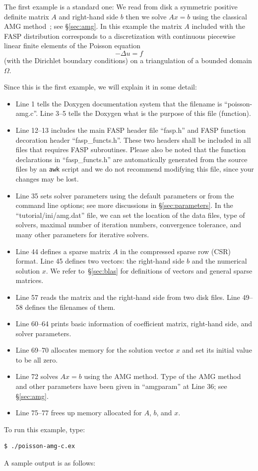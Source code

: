\documentclass[11pt]{memoir}
\begin{document}
The first example is a standard one: We read from disk a symmetric
positive definite matrix $A$ and right-hand side $b$ then we solve
$Ax=b$ using the classical AMG
method~\cite{Brandt.BrandtMcCormick.1982uq,Ruge.RugeStuben.1985ij,Ruge.RugeStuben.1987bs};
see \S\ref{sec:amg}. In this example the matrix $A$ included with the
FASP distribution corresponds to a discretization with continuous
piecewise linear finite elements of the Poisson equation
$$-\Delta u = f$$ (with the Dirichlet boundary conditions) on a
triangulation of a bounded domain $\Omega$.
%

%
Since this is the first example, we will explain it in some detail:
\begin{itemize}
%
\item Line 1 tells the Doxygen documentation system that the filename
  is ``poisson-amg.c''. Line 3--5 tells the Doxygen what is the
  purpose of this file (function).
%
\item Line 12--13 includes the main FASP header file ``fasp.h'' and
  FASP function decoration header ``fasp\_functs.h''. These two
  headers shall be included in all files that requires FASP
  subroutines. Please also be noted that the function declarations in
  ``fasp\_functs.h'' are automatically generated from the source files
  by an \verb|awk| script and we do not recommend modifying this file,
  since your changes may be lost. 
%
\item Line 35 sets solver parameters using the default parameters or
  from the command line options; see more discussions in
  \S\ref{sec:parameters}. In the ``tutorial/ini/amg.dat'' file, we can
  set the location of the data files, type of solvers, maximal number
  of iteration numbers, convergence tolerance, and many other
  parameters for iterative solvers.
%
\item Line 44 defines a sparse matrix $A$ in the compressed sparse row
  (CSR) format. Line 45 defines two vectors: the right-hand side $b$
  and the numerical solution $x$. We refer to~\S\ref{sec:blas} for
  definitions of vectors and general sparse matrices.
%
\item Line 57 reads the matrix and the right-hand side from two disk
  files. Line 49--58 defines the filenames of them.
%
\item Line 60--64 prints basic information of coefficient matrix,
  right-hand side, and solver parameters.
%
\item Line 69--70 allocates memory for the solution vector $x$ and set
  its initial value to be all zero.
%
\item Line 72 solves $Ax=b$ using the AMG method. Type of the AMG
  method and other parameters have been given in ``amgparam'' at Line
  36; see \S\ref{sec:amg}.
%
\item Line 75--77 frees up memory allocated for $A$, $b$, and $x$.
\end{itemize}
%
To run this example, type:
%
\begin{lstlisting}[numbers=none]
$ ./poisson-amg-c.ex
\end{lstlisting}
%
A sample output is as follows:
%

\end{document}
